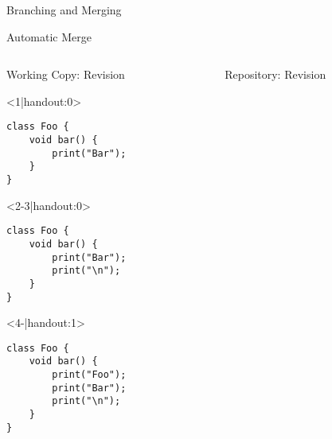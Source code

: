 
\slideMergePull{}

\slideIgnore{}

\begin{frame}{Branching and Merging} %
	\slideBranchingAndMerging{}
\end{frame}

\begin{frame}[fragile]{Automatic Merge} %
	\begin{columns}[onlytextwidth]
		\begin{column}{0.6\linewidth}
			\begin{columns}[T]
				\begin{column}{0.5\linewidth}
					Working Copy: Revision \only<4>{\emph{11$^*$}}\\[2mm]
					
					\begin{onlyenv}<1|handout:0>
						\begin{lstlisting}[style=java,basicstyle=\fontfamily{pcr}\small\selectfont,numbers=none,escapechar=|]
class Foo {
	void bar() {
		print("Bar");
	}
}	
						\end{lstlisting}
					\end{onlyenv}
					\begin{onlyenv}
						\begin{lstlisting}[style=java,basicstyle=\fontfamily{pcr}\small\selectfont,numbers=none,escapechar=|]
class Foo {
	void bar() {
		print("Bar");
		print("\n");
	}
}	
						\end{lstlisting}
					\end{onlyenv}
					\begin{onlyenv}
						\begin{lstlisting}[style=java,basicstyle=\fontfamily{pcr}\small\selectfont,numbers=none,escapechar=|]
class Foo {
	void bar() {
		print("Foo");
		print("Bar");
		print("\n");
	}
}	
						\end{lstlisting}
					\end{onlyenv}
				\end{column}
				\begin{column}{0.5\linewidth}					
					Repository: Revision \only<3->{\emph{11}}
					

\end{column}
\end{columns}
\end{column}
\end{columns}
\end{frame}
